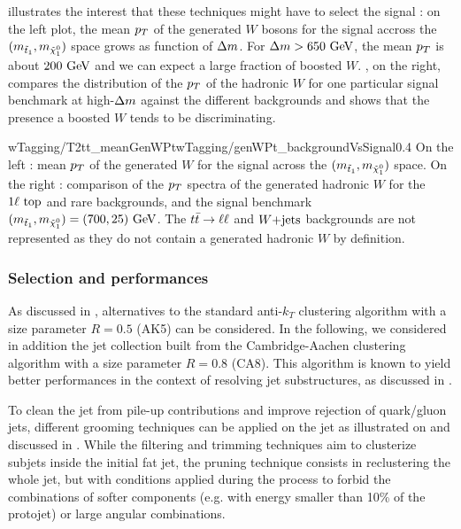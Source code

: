               illustrates the interest that these techniques might have to
             select the signal : on the left plot, the mean $p_T$ of the generated
             $W$ bosons for the signal accross the $(m_{\tilde{t}_1}, m_{\tilde{\chi}_1^0})$
             space grows as function of $\Delta m$. For $\Delta m > 650~\text{GeV}$, the
             mean $p_T$ is about $200~\text{GeV}$ and we can expect a large fraction of boosted $W$.
             , on the right, compares the distribution of the $p_T$ of the
             hadronic $W$ for one particular signal benchmark at high-$\Delta m$ against
             the different backgrounds and shows that the presence a boosted $W$ tends to
             be discriminating.

                              {wTagging/T2tt_meanGenWPt}{wTagging/genWPt_backgroundVsSignal}{0.4}
                              {On the left : mean $p_T$ of the generated $W$ for the
                              signal across the $(m_{\tilde{t}_1}, m_{\tilde{\chi}_1^0})$ space.
                              On the right : comparison of the $p_T$ spectra of the generated
                              hadronic $W$ for the $1\ell~\text{top}$ and rare backgrounds, and
                              the signal benchmark $(m_{\tilde{t}_1}, m_{\tilde{\chi}_1^0}) = (700,25) ~\text{GeV}$.
                              The $t\bar{t} \rightarrow \ell \ell$ and $\text{$W$+jets}$ backgrounds are not represented
                              as they do not contain a generated hadronic $W$ by definition.}

            \subsubsection{Selection and performances}

            As discussed in , alternatives to the
            standard anti-$k_T$ clustering algorithm with a size parameter $R = 0.5$
            (AK5) can be considered. In the following, we considered in addition the jet
            collection built from the Cambridge-Aachen clustering algorithm with a size
            parameter $R = 0.8$ (CA8). This algorithm is known to yield better performances
            in the context of resolving jet substructures, as discussed in
            \cite{jetSubstructureSalam, jetClusteringComparison}.

            To clean the jet from pile-up contributions and improve rejection of
            quark/gluon jets, different grooming techniques can be applied on the jet
            as illustrated on  and discussed in
            \cite{jetClusteringComparison, JME-13-006}.
            While the filtering and trimming techniques aim to clusterize subjets inside
            the initial fat jet, the pruning technique consists in reclustering the whole
            jet, but with conditions applied during the process to forbid the combinations
            of softer components (e.g. with energy smaller than 10\% of the protojet) or
            large angular combinations.

